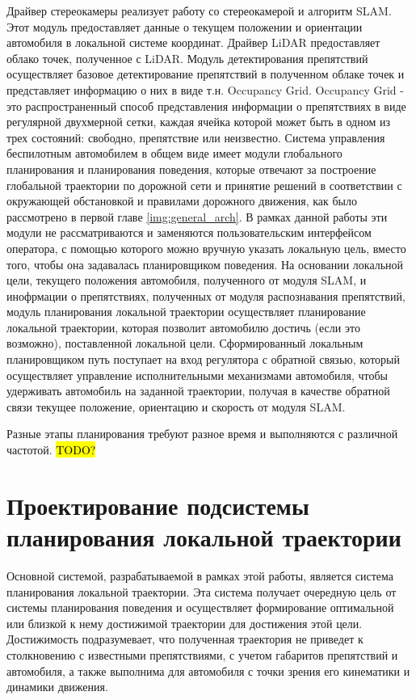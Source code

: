 Драйвер стереокамеры реализует работу со стереокамерой и алгоритм SLAM. Этот модуль предоставляет данные о текущем
положении и ориентации автомобиля в локальной системе координат. Драйвер LiDAR предоставляет облако точек, полученное
с LiDAR. Модуль детектирования препятствий осуществляет базовое детектирование препятствий в полученном облаке точек
и представляет информацию о них в виде т.н. Occupancy Grid. Occupancy Grid - это распространенный способ представления
информации о препятствиях в виде регулярной двухмерной сетки, каждая ячейка которой может быть в одном из трех
состояний: свободно, препятствие или неизвестно. Система управления беспилотным автомобилем в общем виде имеет модули
глобального планирования и планирования поведения, которые отвечают за построение глобальной траектории по дорожной
сети и принятие решений в соответствии с окружающей обстановкой и правилами дорожного движения, как было рассмотрено
в первой главе \ref{img:general_arch}. В рамках данной работы эти модули не рассматриваются и заменяются пользовательским
интерфейсом оператора, с помощью которого можно вручную указать локальную цель, вместо того, чтобы она задавалась
планировщиком поведения. На основании локальной цели, текущего положения автомобиля, полученного от модуля SLAM, и
инофрмации о препятствиях, полученных от модуля распознавания препятствий, модуль планирования локальной траектории
осуществляет планирование локальной траектории, которая позволит автомобилю достичь (если это возможно), поставленной
локальной цели. Сформированный локальным планировщиком путь поступает на вход регулятора с обратной связью, который
осуществляет управление исполнительными механизмами автомобиля, чтобы удерживать автомобиль на заданной траектории,
получая в качестве обратной связи текущее положение, ориентацию и скорость от модуля SLAM.

Разные этапы планирования требуют разное время и выполняются с различной частотой. \hl{TODO?}

\section{Проектирование подсистемы планирования локальной траектории}
Основной системой, разрабатываемой в рамках этой работы, является система планирования локальной траектории. Эта система
получает очередную цель от системы планирования поведения и осуществляет формирование оптимальной или близкой к нему
достижимой траектории для достижения этой цели. Достижимость подразумевает, что полученная траектория не приведет к
столкновению с известными препятствиями, с учетом габаритов препятствий и автомобиля, а также выполнима для автомобиля
с точки зрения его кинематики и динамики движения.


